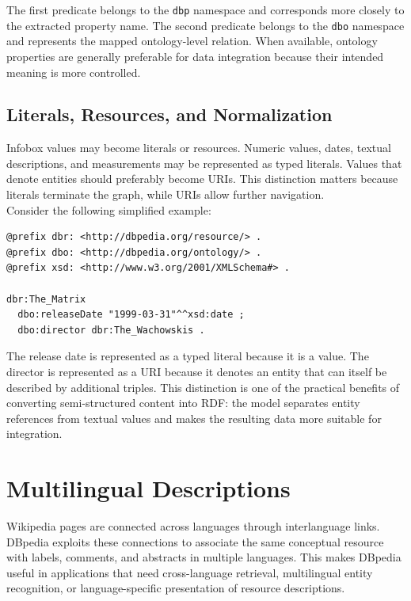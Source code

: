 \documentclass{scrbook}
\begin{document}
	The first predicate belongs to the \texttt{dbp} namespace and corresponds more closely to the extracted property name. The second predicate belongs to the \texttt{dbo} namespace and represents the mapped ontology-level relation. When available, ontology properties are generally preferable for data integration because their intended meaning is more controlled.
	
	\subsection{Literals, Resources, and Normalization}
	
	Infobox values may become literals or resources. Numeric values, dates, textual descriptions, and measurements may be represented as typed literals. Values that denote entities should preferably become URIs. This distinction matters because literals terminate the graph, while URIs allow further navigation.\\
	
	Consider the following simplified example:
	
	\begin{lstlisting}
@prefix dbr: <http://dbpedia.org/resource/> .
@prefix dbo: <http://dbpedia.org/ontology/> .
@prefix xsd: <http://www.w3.org/2001/XMLSchema#> .

dbr:The_Matrix
  dbo:releaseDate "1999-03-31"^^xsd:date ;
  dbo:director dbr:The_Wachowskis .
	\end{lstlisting}
	
	The release date is represented as a typed literal because it is a value. The director is represented as a URI because it denotes an entity that can itself be described by additional triples. This distinction is one of the practical benefits of converting semi-structured content into RDF: the model separates entity references from textual values and makes the resulting data more suitable for integration.
	
	\section{Multilingual Descriptions}
	
	Wikipedia pages are connected across languages through interlanguage links. DBpedia exploits these connections to associate the same conceptual resource with labels, comments, and abstracts in multiple languages. This makes DBpedia useful in applications that need cross-language retrieval, multilingual entity recognition, or language-specific presentation of resource descriptions.\\
	
\end{document}
